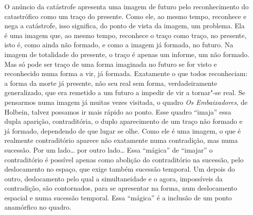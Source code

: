 O anúncio da catástrofe apresenta uma imagem de futuro pelo
reconhecimento do catastrófico como um traço do presente. Como ele, ao
mesmo tempo, reconhece e nega a catástrofe, isso significa, do ponto de
vista da imagem, um problema. Ela é uma imagem que, ao mesmo tempo,
reconhece o traço como traço, no presente, isto é, como ainda não
formado, e como a imagem já formada, no futuro. Na imagem de totalidade
do presente, o traço é apenas um informe, um não formado. Mas só pode
ser traço de uma forma imaginada no futuro se for visto e reconhecido
numa forma a vir, já formada. Exatamente o que todos reconheciam: a
forma da morte já presente, não seu real sem forma, verdadeiramente
generalizado, que era remetido a um futuro a impedir de vir a tornar"-se
real. Se pensarmos numa imagem já muitas vezes visitada, o quadro
\emph{Os Embaixadores}, de Holbein, talvez possamos ir mais rápido ao
ponto. Esse quadro ``imaja'' essa dupla aparição, contraditória, o duplo
aparecimento de um traço não formado e já formado, dependendo de que
lugar se olhe. Como ele é uma imagem, o que é realmente contraditório
aparece não exatamente numa contradição, mas numa sucessão. Por um
lado\ldots{} por outro lado\ldots{} Essa ``mágica'' de ``imajar'' o contraditório
é possível apenas como abolição do contraditório na sucessão, pelo
deslocamento no espaço, que exige também sucessão temporal. Um depois do
outro, deslocamento pelo qual a simultaneidade e o agora, impossíveis da
contradição, são contornados, para se apresentar na forma, num
deslocamento espacial e numa sucessão temporal. Essa ``mágica'' é a
inclusão de um ponto anamórfico no quadro.

